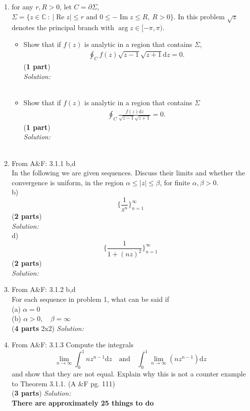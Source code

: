 \documentclass[10pt]{amsart}
\newcommand{\D}{\mathrm{d}}
\DeclareMathOperator{\real}{Re}
\DeclareMathOperator{\imag}{Im}
\theoremstyle{nonumberplain}
\begin{document}
\begin{enumerate}[label={\bf {\arabic*}:}]
\item for any $r, R > 0$, let $C = \partial \Sigma$, $\Sigma = \{z \in \mathbb C ~:~
      |\real z | \leq r \text{ and } 0 \leq -\imag z \leq R, ~ R >
    0\}$.   In this problem $\sqrt{z}$ denotes the principal branch
    with $\arg z  \in [-\pi, \pi)$.
    \begin{itemize}
    \item Show that if $f(z)$ is analytic in a region that contains $\Sigma$,
      \begin{align*}
        \oint_C f(z) \sqrt{z-1} \sqrt{z+1} \D z = 0.
      \end{align*}
(\textbf{1 part}) \\
\textit{Solution:} \\
\\
  \item Show that if $f(z)$ is analytic in a region that contains $\Sigma$
    \begin{align*}
        \oint_C \frac{f(z) \D z}{\sqrt{z-1} \sqrt{z+1}}= 0.
      \end{align*}
(\textbf{1 part}) \\
\textit{Solution:} \\
\\
    \end{itemize}
\item From A\&F: 3.1.1 b,d \\
In the following we are given sequences.
Discuss their limits and whether the convergence is uniform, in the region $\alpha \leq |z| \leq \beta$, for finite $\alpha, \beta > 0$. \\
b) $$ \bigg\{ \frac 1 {z^n} \bigg\}_{n=1}^{\infty} $$
(\textbf{2 parts}) \\
\textit{Solution:}\\

\noindent
d) $$ \bigg\{ \frac 1 {1 + (nz)^2} \bigg\}_{n=1}^{\infty} $$
(\textbf{2 parts}) \\
\textit{Solution:}\\

\item From A\&F: 3.1.2 b,d \\
For each sequence in problem 1, what can be said if \\
(a) $\alpha = 0$ \\
(b) $\alpha > 0, \quad \beta = \infty$ \\
(\textbf{4 parts} 2x2)
\textit{Solution:}
\item From A\&F: 3.1.3
Compute the integrals
$$
\lim_{n \rightarrow \infty} \int_0^1 nz^{n -1}\D z \quad \text{and} \quad \int_0^1 \lim_{n \rightarrow \infty} \left(nz^{n -1} \right) \D z
$$
and show that they are not equal.
Explain why this is not a counter example to Theorem 3.1.1. (A \&F pg. 111) \\
(\textbf{3 parts})
\textit{Solution:} \\
    
    
\textbf{There are approximately 25 things to do}
\end{enumerate}
\end{document}
